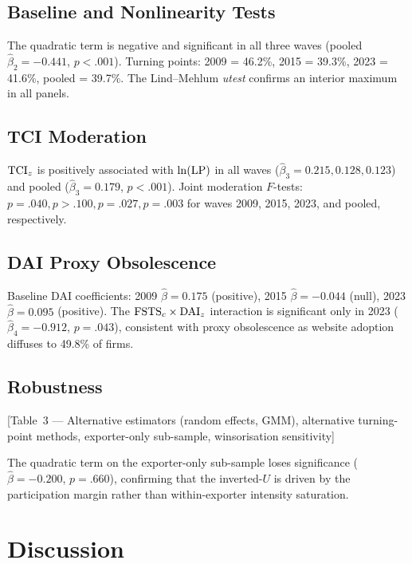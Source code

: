 \documentclass[12pt,a4paper]{article}
\begin{document}
\subsection{Baseline and Nonlinearity Tests}

The quadratic term is negative and significant in all three waves
(pooled \(\hat{\beta}_{2} = -0.441\), \(p < .001\)).  Turning points:
2009 = 46.2\%, 2015 = 39.3\%, 2023 = 41.6\%, pooled = 39.7\%.
The Lind--Mehlum \textit{utest} confirms an interior maximum in all panels.

\subsection{TCI Moderation}

\({\mathrm{TCI}_{z}}\) is positively associated with \({\ln(\mathrm{LP})}\) in all waves
(\(\hat{\beta}_{3} = 0.215, 0.128, 0.123\)) and pooled
(\(\hat{\beta}_{3} = 0.179\), \(p < .001\)).
Joint moderation \(F\)-tests: \(p = .040, p > .100, p = .027, p = .003\)
for waves 2009, 2015, 2023, and pooled, respectively.

\subsection{DAI Proxy Obsolescence}

Baseline DAI coefficients: 2009 \(\hat{\beta} = 0.175\) (positive),
2015 \(\hat{\beta} = -0.044\) (null), 2023 \(\hat{\beta} = 0.095\) (positive).
The \({\mathrm{FSTS}_{c}} \times {\mathrm{DAI}_{z}}\) interaction is significant only in 2023
(\(\hat{\beta}_{4} = -0.912\), \(p = .043\)), consistent with proxy
obsolescence as website adoption diffuses to 49.8\% of firms.

\subsection{Robustness}

[Table~3 --- Alternative estimators (random effects, GMM), alternative
turning-point methods, exporter-only sub-sample, winsorisation sensitivity]

The quadratic term on the exporter-only sub-sample loses significance
(\(\hat{\beta} = -0.200\), \(p = .660\)), confirming that the inverted-\(U\)
is driven by the participation margin rather than within-exporter intensity
saturation.

\section{Discussion}
\label{sec:discussion}
\end{document}
